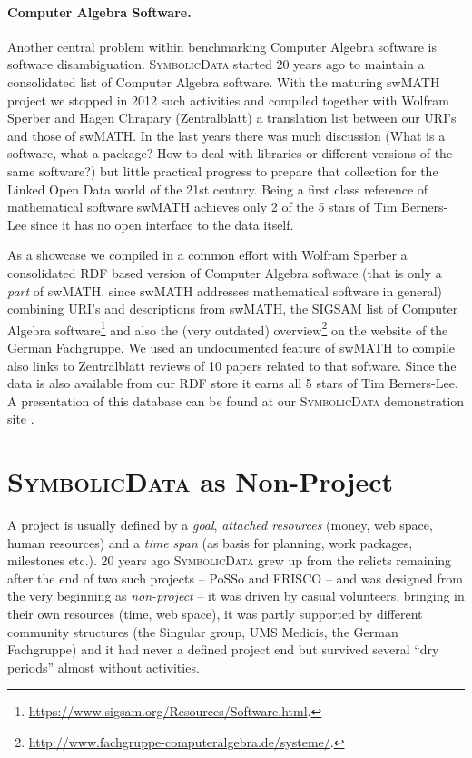 \documentclass[12pt]{article}
\def\SD{\textsc{Sym\-bolic\-Data}}
\begin{document}
\paragraph{Computer Algebra Software.}
Another central problem within benchmarking Computer Algebra software is
software disambiguation. {\SD} started 20 years ago to maintain a consolidated
list of Computer Algebra software. With the maturing swMATH project
\cite{swmath} we stopped in 2012 such activities and compiled together with
Wolfram Sperber and Hagen Chrapary (Zentralblatt) a translation list between
our URI's and those of swMATH. In the last years there was much discussion
(What is a software, what a package? How to deal with libraries or different
versions of the same software?)  but little practical progress to prepare that
collection for the Linked Open Data world of the 21st century. Being a first
class reference of mathematical software swMATH achieves only 2 of the 5 stars
of Tim Berners-Lee since it has no open interface to the data itself.

As a showcase we compiled in a common effort with Wolfram Sperber a
consolidated RDF based version of Computer Algebra software (that is only a
\emph{part} of swMATH, since swMATH addresses mathematical software in
general) combining URI's and descriptions from swMATH, the SIGSAM list of
Computer Algebra
software\footnote{\url{https://www.sigsam.org/Resources/Software.html}.} and
also the (very outdated)
overview\footnote{\url{http://www.fachgruppe-computeralgebra.de/systeme/}.} on
the website of the German Fachgruppe.  We used an undocumented feature of
swMATH to compile also links to Zentralblatt reviews of 10 papers related to
that software.  Since the data is also available from our RDF store it earns
all 5 stars of Tim Berners-Lee.  A presentation of this database can be found
at our {\SD} demonstration site \cite{sdinfo}.

\section{{\SD} as Non-Project}

A project is usually defined by a \emph{goal}, \emph{attached resources}
(money, web space, human resources) and a \emph{time span} (as basis for
planning, work packages, milestones etc.).  20 years ago {\SD} grew up from
the relicts remaining after the end of two such projects -- PoSSo and FRISCO
-- and was designed from the very beginning as \emph{non-project} -- it was
driven by casual volunteers, bringing in their own resources (time, web
space), it was partly supported by different community structures (the
Singular group, UMS Medicis, the German Fachgruppe) and it had never a defined
project end but survived several ``dry periods'' almost without activities.
\end{document}
